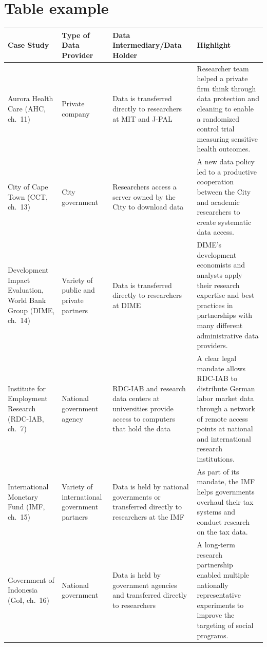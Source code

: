 \documentclass[11pt]{book}
\begin{document}
\newpage
\section{Table example}
\begin{table}
\fontsize{7.5}{10}\selectfont
\begin{tabular}[t]{>{\raggedright\arraybackslash}p{12em}>{\raggedright\arraybackslash}p{8em}>{\raggedright\arraybackslash}p{20em}>{\raggedright\arraybackslash}p{24em}}
\toprule
Case Study & Type of Data Provider & Data Intermediary/Data Holder & Highlight\\
\midrule
Aurora Health Care (AHC, ch.\ 11) & Private company & Data is transferred directly to researchers at MIT and J-PAL & Researcher team helped a private firm think through data protection and cleaning to enable a randomized control trial measuring sensitive health outcomes.\\
City of Cape Town (CCT, ch.\ 13) & City government & Researchers access a server owned by the City to download data & A new data policy led to a productive cooperation between the City and academic researchers to create systematic data access.\\
Development Impact Evaluation, World Bank Group (DIME, ch.\ 14) & Variety of public and private partners & Data is transferred directly to researchers at DIME & DIME's development economists and analysts apply their research expertise and best practices in partnerships with many different administrative data providers.\\
Institute for Employment Research (RDC-IAB, ch.\ 7) & National government agency & RDC-IAB and research data centers at universities provide access to computers that hold the data & A clear legal mandate allows RDC-IAB to distribute German labor market data through a network of remote access points  at national and international research institutions.\\
International Monetary Fund (IMF, ch.\ 15) & Variety of international government partners & Data is held by national governments or transferred directly to researchers at the IMF & As part of its mandate, the IMF helps governments overhaul their tax systems and conduct research on the tax data.\\
\addlinespace
Government of Indonesia (GoI, ch.\ 16) & National government & Data is held by government agencies and transferred directly to researchers & A long-term research partnership enabled multiple nationally representative experiments to improve the targeting of social programs.\\

\end{tabular}
\end{table}
\end{document}
